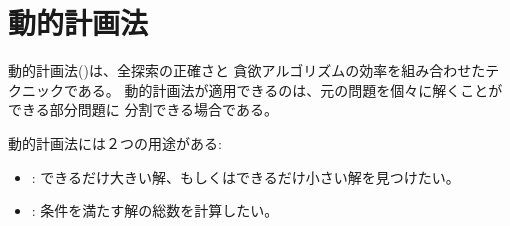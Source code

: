 \begin{comment}
\chapter{Dynamic programming}

\index{dynamic programming}

\key{Dynamic programming}
is a technique that combines the correctness
of complete search and the efficiency
of greedy algorithms.
Dynamic programming can be applied if the
problem can be divided into overlapping subproblems
that can be solved independently.

There are two uses for dynamic programming:

\begin{itemize}
\item
\key{Finding an optimal solution}:
We want to find a solution that is
as large as possible or as small as possible.
\item
\key{Counting the number of solutions}:
We want to calculate the total number of
possible solutions.
\end{itemize}
\end{comment}


\chapter{動的計画法}


動的計画法()は、全探索の正確さと
貪欲アルゴリズムの効率を組み合わせたテクニックである。
動的計画法が適用できるのは、元の問題を個々に解くことができる部分問題に
分割できる場合である。

動的計画法には２つの用途がある:

\begin{itemize}
\item
{}:
できるだけ大きい解、もしくはできるだけ小さい解を見つけたい。
\item
{}:
条件を満たす解の総数を計算したい。
\end{itemize}

\begin{comment}
We will first see how dynamic programming can
be used to find an optimal solution,
and then we will use the same idea for
counting the solutions.

Understanding dynamic programming is a milestone
in every competitive programmer's career.
While the basic idea is simple,
the challenge is how to apply
dynamic programming to different problems.
This chapter introduces a set of classic problems
that are a good starting point.
\end{comment}

